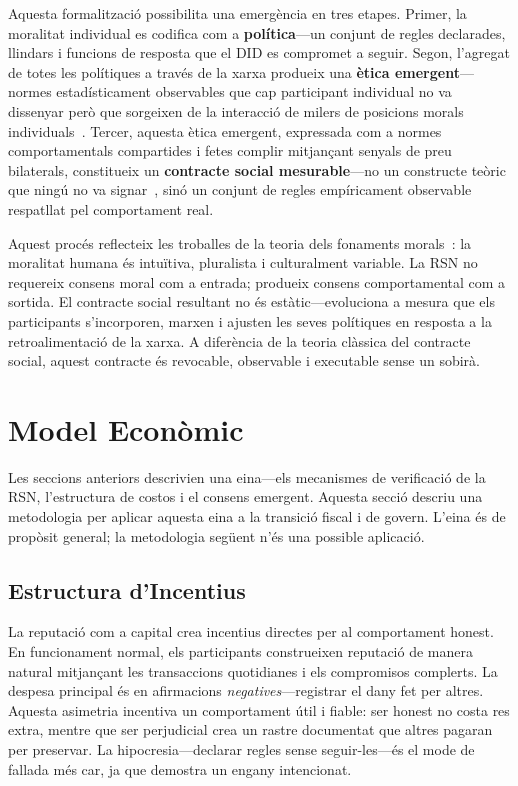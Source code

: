 \documentclass[11pt,a4paper,twocolumn]{article}
\begin{document}
Aquesta formalització possibilita una emergència en tres etapes. Primer, la moralitat individual es codifica com a \textbf{política}---un conjunt de regles declarades, llindars i funcions de resposta que el DID es compromet a seguir. Segon, l'agregat de totes les polítiques a través de la xarxa produeix una \textbf{ètica emergent}---normes estadísticament observables que cap participant individual no va dissenyar però que sorgeixen de la interacció de milers de posicions morals individuals~\cite{durkheim1893}. Tercer, aquesta ètica emergent, expressada com a normes comportamentals compartides i fetes complir mitjançant senyals de preu bilaterals, constitueix un \textbf{contracte social mesurable}---no un constructe teòric que ningú no va signar~\cite{rawls1971}, sinó un conjunt de regles empíricament observable respatllat pel comportament real.

Aquest procés reflecteix les troballes de la teoria dels fonaments morals~\cite{haidt2012}: la moralitat humana és intuïtiva, pluralista i culturalment variable. La RSN no requereix consens moral com a entrada; produeix consens comportamental com a sortida. El contracte social resultant no és estàtic---evoluciona a mesura que els participants s'incorporen, marxen i ajusten les seves polítiques en resposta a la retroalimentació de la xarxa. A diferència de la teoria clàssica del contracte social, aquest contracte és revocable, observable i executable sense un sobirà.

\section{Model Econòmic}

Les seccions anteriors descrivien una eina---els mecanismes de verificació de la RSN, l'estructura de costos i el consens emergent. Aquesta secció descriu una metodologia per aplicar aquesta eina a la transició fiscal i de govern. L'eina és de propòsit general; la metodologia següent n'és una possible aplicació.

\subsection{Estructura d'Incentius}

La reputació com a capital crea incentius directes per al comportament honest. En funcionament normal, els participants construeixen reputació de manera natural mitjançant les transaccions quotidianes i els compromisos complerts. La despesa principal és en afirmacions \emph{negatives}---registrar el dany fet per altres. Aquesta asimetria incentiva un comportament útil i fiable: ser honest no costa res extra, mentre que ser perjudicial crea un rastre documentat que altres pagaran per preservar. La hipocresia---declarar regles sense seguir-les---és el mode de fallada més car, ja que demostra un engany intencionat.
\end{document}
